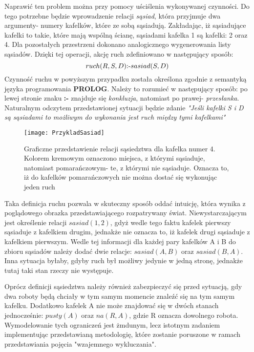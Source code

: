    Naprawić ten problem można przy pomocy uściślenia wykonywanej czynności. Do tego potrzebne będzie wprowadzenie relacji \textit{sąsiad}, która 
    przyjmuje dwa argumenty- numery kafelków, które ze sobą sąsiadują. Zakładając, iż sąsiadujące kafelki to takie, które mają wspólną ścianę, sąsiadami 
    kafelka 1 są kafelki: 2 oraz 4. Dla pozostałych przestrzeni dokonano analogicznego wygenerowania listy sąsiadów. Dzięki tej operacji, 
    akcję ruch zdefiniowano w następujący sposób:
    \begin{equation}
        ruch(R,S,D) \textnormal{:-} sasiad(S,D)
    \end{equation}
    Czynność ruchu w powyższym przypadku została określona zgodnie z semantyką języka programowania \textbf{PROLOG}. Należy to rozumieć w następujący sposób:
    po lewej stronie znaku \textbf{:-} znajduje się \textit{konkluzja}, natomiast po prawej- \textit{przesłanka}. Naturalnym odczytem przedstawionej sytuacji
    będzie zdanie \textit{"Jeśli kafelki S i D są sąsiadami to możliwym do wykonania jest ruch między tymi kafelkami"}
    \begin{figure}[H]
        \texttt{[image: PrzykladSasiad]}
        \centering
        \caption{Graficzne przedstawienie relacji sąsiedztwa dla kafelka numer 4. Kolorem kremowym oznaczono miejsca, z którymi sąsiaduje, natomiast 
        pomarańczowym- te, z którymi nie sąsiaduje. Oznacza to, iż do kafelków pomarańczowych nie można dostać się wykonując jeden ruch}
        \label{PrzykladAkcje}
    \end{figure}
    Taka definicja ruchu pozwala w skuteczny sposób oddać intuicję, która wynika z poglądowego obrazka przedstawiającego rozpatrywany świat.
    Niewystarczającym jest określenie relacji $sasiad(1,2)$, gdyż wedle tego faktu kafelek pierwszy sąsiaduje z kafelkiem drugim, jednakże nie oznacza 
    to, iż kafelek drugi sąsiaduje z kafelkiem pierwszym. Wedle tej informacji dla każdej pary kafelków A i B do zbioru sąsiadów należy dodać dwie relacje:
    $sasiad(A,B)$ oraz $sasiad(B,A)$. Inna sytuacja byłaby, gdyby ruch był możliwy jedynie w jedną stronę, jednakże tutaj taki stan rzeczy nie występuje.


    Oprócz definicji sąsiedztwa należy również zabezpieczyć się przed sytuacją, gdy dwa roboty będą chciały w tym samym momencie znaleźć się na tym samym 
    kafelku. Dodatkowo kafelek A nie może znajdować się w dwóch stanach jednocześnie: $pusty(A)$ oraz $na(R,A)$, gdzie R oznacza dowolnego robota. 
    Wymodelowanie tych ograniczeń jest żmdunym, lecz istotnym zadaniem implementując przedstawianą metodologię, które zostanie poruszone w ramach 
    przedstawiania pojęcia "wzajemnego wykluczania".
    

